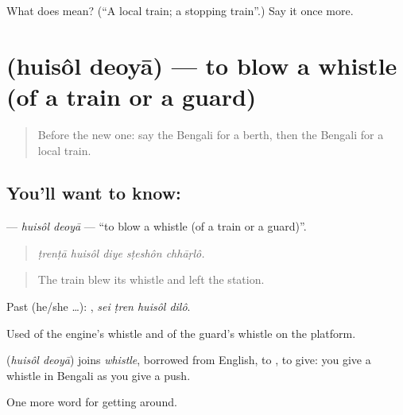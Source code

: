 \begin{tcolorbox}[breakable,colback=teal!4,colframe=teal!35!black,title={Before you move on}]
What does  mean? (\textquotedblleft{}A local train; a stopping train\textquotedblright{}.) Say it once more.
\end{tcolorbox}
\section[\texorpdfstring{\bn{হুইসল} \bn{দেওয়া} (huisôl deoyā)}{হুইসল দেওয়া (huisôl deoyā)}]{  (huisôl deoyā) — to blow a whistle (of a train or a guard)}

\label{lesson:BN-C384-huisol-deoya}



\begin{quote}
Before the new one: say the Bengali for a berth, then the Bengali for a local train.
\end{quote}

\subsection*{You'll want to know:  }
\textbf{ } — \emph{huisôl deoyā} — \textquotedblleft{}to blow a whistle (of a train or a guard)\textquotedblright{}.

\begin{quote}
    
\end{quote}

\begin{quote}
\emph{ṭrenṭā huisôl diye sṭeshôn chhāṛlô.}
\end{quote}

\begin{quote}
The train blew its whistle and left the station.
\end{quote}

Past (he/she …):    , \emph{sei ṭren huisôl dilô}.

Used of the engine's whistle and of the guard's whistle on the platform.

\begin{cousinweb}
\textbf{ } (\emph{huisôl deoyā}) joins \emph{whistle}, borrowed from English, to , to give: you give a whistle in Bengali as you give a push.
\end{cousinweb}

\begin{grammarlens}[title={What you've built}]
One more word for getting around.
\end{grammarlens}

